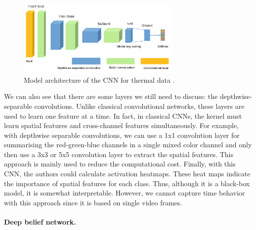 \begin{figure}
    \centering
    \includegraphics[width=0.7\textwidth]{Images/CNN residual heat.png}
    \caption[CNN for residual heat.]{Model architecture of the CNN for thermal data \cite{baumgartl_deep_2020}.}
    \label{fig:cnnresidual}
\end{figure}
We can also see that there are some layers we still need to discuss: the depthwise-separable convolutions. Unlike classical convolutional networks, these layers are used to learn one feature at a time. In fact, in classical CNNs, the kernel must learn spatial features and cross-channel features simultaneously. For example, with depthwise separable convolutions, we can use a 1x1 convolution layer for summarising the red-green-blue channels in a single mixed color channel and only then use a 3x3 or 5x5 convolution layer to extract the spatial features. This approach is mainly used to reduce the computational cost. Finally, with this CNN, the authors could calculate activation heatmaps. These heat maps indicate the importance of spatial features for each class. Thus, although it is a black-box model, it is somewhat interpretable. However, we cannot capture time behavior with this approach since it is based on single video frames.

\paragraph{Deep belief network.}

